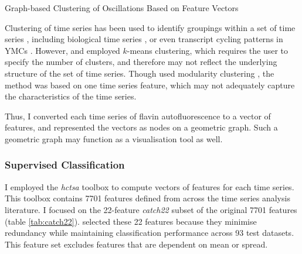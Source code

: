 Graph-based Clustering of Oscillations Based on Feature Vectors

Clustering of time series has been used to identify groupings within a set of time series \citep{wangStructureBasedStatisticalFeatures2007}, including biological time series \citep{shafieiDopamineSignalingModulates2019}, or even transcript cycling patterns in YMCs \citep{tuLogicYeastMetabolic2005}.
However, \citet{wangStructureBasedStatisticalFeatures2007} and \citet{tuLogicYeastMetabolic2005} employed $k$-means clustering, which requires the user to specify the number of clusters, and therefore may not reflect the underlying structure of the set of time series.
Though \citet{shafieiDopamineSignalingModulates2019} used modularity clustering \citep{newmanModularityCommunityStructure2006}, the method was based on one time series feature, which may not adequately capture the characteristics of the time series.

Thus, I converted each time series of flavin autofluorescence to a vector of features, and represented the vectors as nodes on a geometric graph.
Such a geometric graph may function as a visualisation tool as well.


\subsubsection{Supervised Classification}
\label{sec:graphclustering-supervised}

I employed the \emph{hctsa} toolbox \citep{fulcherHctsaComputationalFramework2017} to compute vectors of features for each time series.
This toolbox contains 7701 features defined from across the time series analysis literature.
I focused on the 22-feature \emph{catch22} subset of the original 7701 features (table \ref{tab:catch22}).
\citet{lubbaCatch22CAnonicalTimeseries2019} selected these 22 features because they minimise redundancy while maintaining classification performance across 93 test datasets.
This feature set excludes features that are dependent on mean or spread.

